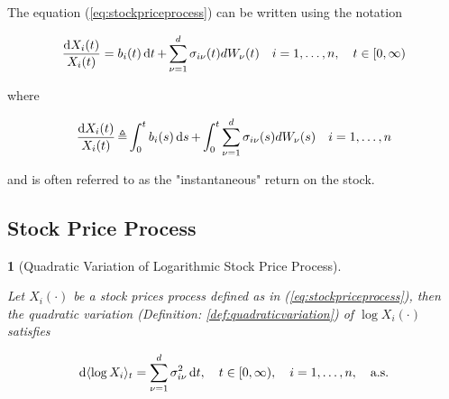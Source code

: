 \documentclass[british]{amsart}
\numberwithin{equation}{section}
\numberwithin{figure}{section}
\theoremstyle{plain}
\theoremstyle{definition}
\theoremstyle{plain}
\theoremstyle{plain}
\theoremstyle{plain}
\newtheorem{prop}[thm]{\protect\propositionname}
\theoremstyle{remark}
\theoremstyle{plain}
\providecommand{\propositionname}{Proposition}
\renewcommand{\d}[1]{\mathop{\mathrm{d}{#1}}}
\newcommand{\ranget}{t\in[0,\infty)}
\newcommand{\defeq}{\mathop{\triangleq}}
\newcommand{\almostsurely}{\text{a.s.}}
\begin{document}
The equation (\ref{eq:stockpriceprocess}) can be written using the notation 

\begin{equation}
	\label{eq:stockpriceprocessdiff}
		\frac{\d{X_{i}(t)}}{X_{i}(t)} = 
				b_{i}(t)\d{t} + 
				\sum_{\nu=1}^{d} \sigma_{i\nu}(t) dW_{\nu}(t)
			\quad \rangei,
			\quad \ranget
\end{equation}

where 

\begin{equation}
	\label{eq:stockpriceprocessdiff}
		\frac{\d{X_{i}(t)}}{X_{i}(t)} \defeq 
				\int_{0}^{t} b_{i}(s)\d{s} + 
				\int_{0}^{t} \sum_{\nu=1}^{d} \sigma_{i\nu}(s) dW_{\nu}(s)
			\quad \rangei
\end{equation}



and is often referred to as the "instantaneous" return on the stock.

\subsection{Stock Price Process}

\begin{prop} [Quadratic Variation of Logarithmic Stock Price Process]
	\label{prop:crossvarlogX}

	Let $X_{i}(\cdot)$ be a stock prices process defined as in (\ref{eq:stockpriceprocess}), 
	then the quadratic variation (Definition: \ref{def:quadraticvariation}) of
	$\log{X_{i}(\cdot)}$ satisfies

	\begin{equation}
		\d{\langle \log{X_{i}} \rangle_{t}} = \sum_{\nu=1}^{d} \sigma_{i\nu}^2\d{t},
		\quad \ranget,
		\quad \rangei,
		\quad \almostsurely
	\end{equation}

\end{prop}
\end{document}
